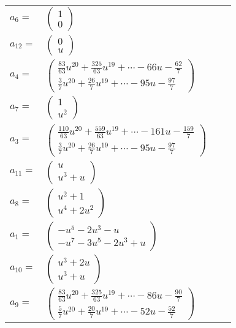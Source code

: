 \documentclass[1p]{elsarticle_modified}
\theoremstyle{definition}
\begin{document}
\begin{tabular}{m{7pt} m{180pt} m{7pt} m{180pt} }
\flushright $a_{6}=$&$\begin{pmatrix}1\\0\end{pmatrix}$ \\
\flushright $a_{12}=$&$\begin{pmatrix}0\\u\end{pmatrix}$ \\
\flushright $a_{4}=$&$\begin{pmatrix}\frac{83}{63} u^{20}+\frac{325}{63} u^{19}+\cdots-66 u-\frac{62}{7}\\\frac{3}{7} u^{20}+\frac{26}{7} u^{19}+\cdots-95 u-\frac{97}{7}\end{pmatrix}$ \\
\flushright $a_{7}=$&$\begin{pmatrix}1\\u^2\end{pmatrix}$ \\
\flushright $a_{3}=$&$\begin{pmatrix}\frac{110}{63} u^{20}+\frac{559}{63} u^{19}+\cdots-161 u-\frac{159}{7}\\\frac{3}{7} u^{20}+\frac{26}{7} u^{19}+\cdots-95 u-\frac{97}{7}\end{pmatrix}$ \\
\flushright $a_{11}=$&$\begin{pmatrix}u\\u^3+u\end{pmatrix}$ \\
\flushright $a_{8}=$&$\begin{pmatrix}u^2+1\\u^4+2 u^2\end{pmatrix}$ \\
\flushright $a_{1}=$&$\begin{pmatrix}- u^5-2 u^3- u\\- u^7-3 u^5-2 u^3+u\end{pmatrix}$ \\
\flushright $a_{10}=$&$\begin{pmatrix}u^3+2 u\\u^3+u\end{pmatrix}$ \\
\flushright $a_{9}=$&$\begin{pmatrix}\frac{83}{63} u^{20}+\frac{325}{63} u^{19}+\cdots-86 u-\frac{90}{7}\\\frac{5}{7} u^{20}+\frac{20}{7} u^{19}+\cdots-52 u-\frac{52}{7}\end{pmatrix}$ \\

\end{tabular}
\end{document}
